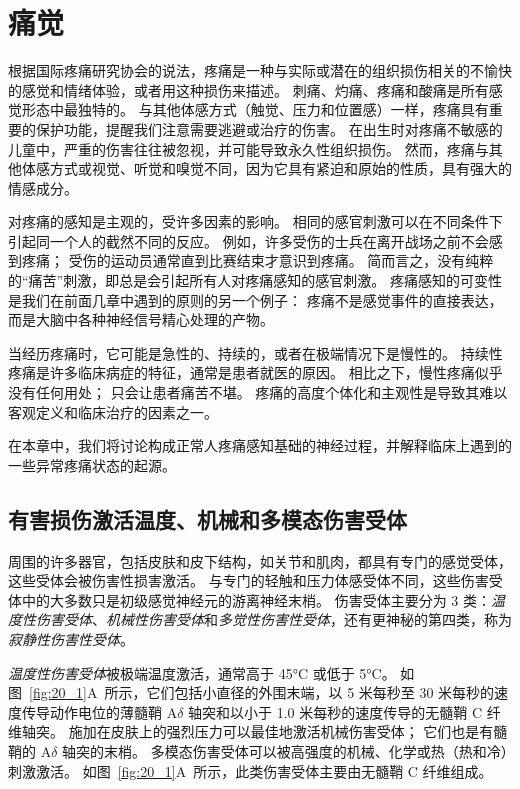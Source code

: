 \chapter{痛觉} \label{chap:chap20}

根据国际疼痛研究协会的说法，疼痛是一种与实际或潜在的组织损伤相关的不愉快的感觉和情绪体验，或者用这种损伤来描述。
刺痛、灼痛、疼痛和酸痛是所有感觉形态中最独特的。
与其他体感方式（触觉、压力和位置感）一样，疼痛具有重要的保护功能，提醒我们注意需要逃避或治疗的伤害。 
在出生时对疼痛不敏感的儿童中，严重的伤害往往被忽视，并可能导致永久性组织损伤。
然而，疼痛与其他体感方式或视觉、听觉和嗅觉不同，因为它具有紧迫和原始的性质，具有强大的情感成分。



对疼痛的感知是主观的，受许多因素的影响。
相同的感官刺激可以在不同条件下引起同一个人的截然不同的反应。
例如，许多受伤的士兵在离开战场之前不会感到疼痛；
受伤的运动员通常直到比赛结束才意识到疼痛。
简而言之，没有纯粹的“痛苦”刺激，即总是会引起所有人对疼痛感知的感官刺激。
疼痛感知的可变性是我们在前面几章中遇到的原则的另一个例子：
疼痛不是感觉事件的直接表达，而是大脑中各种神经信号精心处理的产物。


当经历疼痛时，它可能是急性的、持续的，或者在极端情况下是慢性的。
持续性疼痛是许多临床病症的特征，通常是患者就医的原因。
相比之下，慢性疼痛似乎没有任何用处；
只会让患者痛苦不堪。
疼痛的高度个体化和主观性是导致其难以客观定义和临床治疗的因素之一。


在本章中，我们将讨论构成正常人疼痛感知基础的神经过程，并解释临床上遇到的一些异常疼痛状态的起源。



\section{有害损伤激活温度、机械和多模态伤害受体}

周围的许多器官，包括皮肤和皮下结构，如关节和肌肉，都具有专门的感觉受体，这些受体会被伤害性损害激活。
与专门的轻触和压力体感受体不同，这些伤害受体中的大多数只是初级感觉神经元的游离神经末梢。
伤害受体主要分为 3 类：\textit{温度性伤害受体}、\textit{机械性伤害受体}和\textit{多觉性伤害性受体}，还有更神秘的第四类，称为\textit{寂静性伤害性受体}。


\textit{温度性伤害受体}被极端温度激活，通常高于 45°C 或低于 5°C。
如图~\ref{fig:20_1}A~所示，它们包括小直径的外围末端，以 5 米每秒至 30 米每秒的速度传导动作电位的薄髓鞘 A$\delta$ 轴突和以小于 1.0 米每秒的速度传导的无髓鞘 C 纤维轴突。
施加在皮肤上的强烈压力可以最佳地激活机械伤害受体；
它们也是有髓鞘的 A$\delta$ 轴突的末梢。
多模态伤害受体可以被高强度的机械、化学或热（热和冷）刺激激活。
如图~\ref{fig:20_1}A~所示，此类伤害受体主要由无髓鞘 C 纤维组成。


